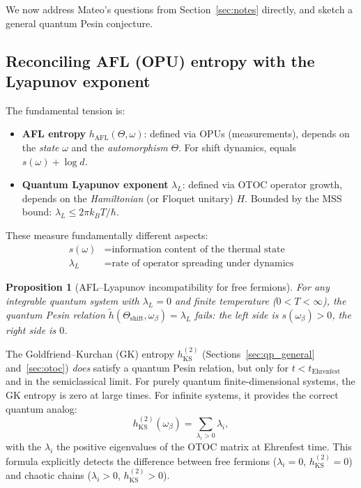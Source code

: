 \documentclass[12pt,a4paper]{article}
\newtheorem{proposition}[theorem]{Proposition}
\begin{document}
We now address Mateo's questions from Section~\ref{sec:notes} directly, and sketch a
general quantum Pesin conjecture.

\subsection{Reconciling AFL (OPU) entropy with the Lyapunov exponent}

The fundamental tension is:
\begin{itemize}
  \item \textbf{AFL entropy} $h_{\mathrm{AFL}}(\Theta, \omega)$: defined via OPUs
        (measurements), depends on the \emph{state} $\omega$ and the \emph{automorphism}
        $\Theta$.  For shift dynamics, equals $s(\omega) + \log d$.
  \item \textbf{Quantum Lyapunov exponent} $\lambda_L$: defined via OTOC operator
        growth, depends on the \emph{Hamiltonian} (or Floquet unitary) $H$.
        Bounded by the MSS bound: $\lambda_L \leq 2\pi k_B T / \hbar$.
\end{itemize}

These measure fundamentally different aspects:
\begin{align*}
  s(\omega) &= \text{information content of the thermal state} \\
  \lambda_L &= \text{rate of operator spreading under dynamics}
\end{align*}

\begin{proposition}[AFL--Lyapunov incompatibility for free fermions]
  For any integrable quantum system with $\lambda_L = 0$ and finite temperature
  ($0 < T < \infty$), the quantum Pesin relation
  $\widetilde{h}(\Theta_{\mathrm{shift}}, \omega_\beta) = \lambda_L$ fails:
  the left side is $s(\omega_\beta) > 0$, the right side is $0$.
\end{proposition}

\noindent
The Goldfriend--Kurchan (GK) entropy $h_{\mathrm{KS}}^{(2)}$ (Sections~\ref{sec:qp_general} and~\ref{sec:otoc})
\emph{does} satisfy a quantum Pesin relation, but only for $t < t_{\mathrm{Ehrenfest}}$
and in the semiclassical limit.  For purely quantum finite-dimensional systems, the GK
entropy is zero at large times.  For infinite systems, it provides the correct quantum
analog:
\[
  h_{\mathrm{KS}}^{(2)}(\omega_\beta) = \sum_{\lambda_i > 0} \lambda_i,
\]
with the $\lambda_i$ the positive eigenvalues of the OTOC matrix at Ehrenfest time.
This formula explicitly detects the difference between free fermions ($\lambda_i = 0$,
$h_{\mathrm{KS}}^{(2)} = 0$) and chaotic chains ($\lambda_i > 0$,
$h_{\mathrm{KS}}^{(2)} > 0$).
\end{document}
